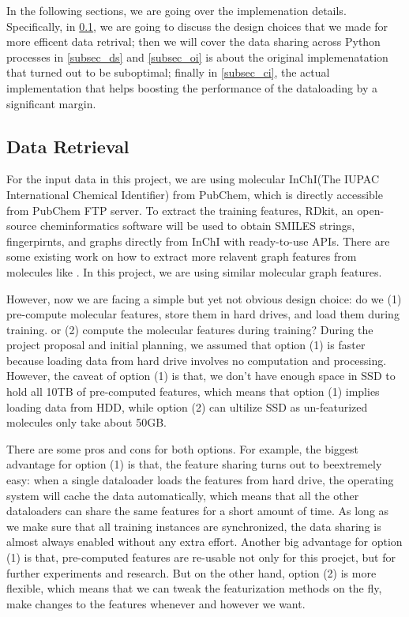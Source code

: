 \documentclass[conference]{IEEEtran}
\begin{document}
In the following sections, we are going over the implemenation details. 
Specifically, in \ref{subsec_dr}, we are going to discuss the design choices that we made for more efficent data retrival; then we will cover the data sharing across Python processes in \ref{subsec_ds} and \ref{subsec_oi} is about the original implemenatation that turned out to be suboptimal; finally in \ref{subsec_ci}, the actual implementation that helps boosting the performance of the dataloading by a significant margin.

\subsection{Data Retrieval} \label{subsec_dr} 

For the input data in this project, we are using molecular InChI(The IUPAC International Chemical Identifier) from PubChem, which is directly accessible from PubChem FTP server. 
To extract the training features, RDkit, an open-source cheminformatics software will be used to obtain SMILES strings, fingerpirnts, and graphs directly from InChI with ready-to-use APIs. 
There are some existing work on how to extract more relavent graph features from molecules like \cite{gcn_fp}. In this project, we are using similar molecular graph features. 

However, now we are facing a simple but yet not obvious design choice: do we (1) pre-compute molecular features, store them in hard drives, and load them during training. or (2) compute the molecular features during training? 
During the project proposal and initial planning, we assumed that option (1) is faster because loading data from hard drive involves no computation and processing. 
However, the caveat of option (1) is that, we don't have enough space in SSD to hold all 10TB of pre-computed features, which means that option (1) implies loading data from HDD, while option (2) can ultilize SSD as un-featurized molecules only take about 50GB. 

There are some pros and cons for both options. 
For example, the biggest advantage for option (1) is that, the feature sharing turns out to beextremely easy: when a single dataloader loads the features from hard drive, the operating system will cache the data automatically, which means that all the other dataloaders can share the same features for a short amount of time. 
As long as we make sure that all training instances are synchronized, the data sharing is almost always enabled without any extra effort. 
Another big advantage for option (1) is that, pre-computed features are re-usable not only for this proejct, but for further experiments and research. 
But on the other hand, option (2) is more flexible, which means that we can tweak the featurization methods on the fly, make changes to the features whenever and however we want. 
\end{document}
